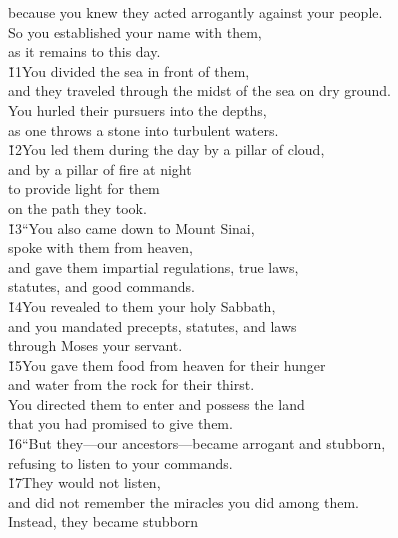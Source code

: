 \begin{poetry}
\poemll    because you knew they acted arrogantly against your people. \\
\poeml So you established your name with them, \\
\poemll    as it remains to this day. \\
\poeml \v{11}You divided the sea in front of them, \\
\poemll    and they traveled through the midst of the sea on dry ground. \\
\poeml You hurled their pursuers into the depths, \\
\poemll    as one throws a stone into turbulent waters. \\
\poeml \v{12}You led them during the day by a pillar of cloud, \\
\poemll    and by a pillar of fire at night \\
\poeml to provide light for them \\
\poemll    on the path they took. \\
\poeml \v{13}``You also came down to Mount Sinai, \\
\poemll    spoke with them from heaven, \\
\poeml and gave them impartial regulations, true laws, \\
\poemll    statutes, and good commands. \\
\poeml \v{14}You revealed to them your holy Sabbath, \\
\poemll    and you mandated precepts, statutes, and laws \\
\poemlll       through Moses your servant. \\
\poeml \v{15}You gave them food from heaven for their hunger \\
\poemll    and water from the rock for their thirst. \\
\poeml You directed them to enter and possess the land \\
\poemll    that you had promised to give them. \\
\poeml \v{16}``But they---our ancestors---became arrogant and stubborn, \\
\poemll    refusing to listen to your commands. \\
\poeml \v{17}They would not listen, \\
\poemll    and did not remember the miracles you did among them. \\
\poeml Instead, they became stubborn \\

\end{poetry}
